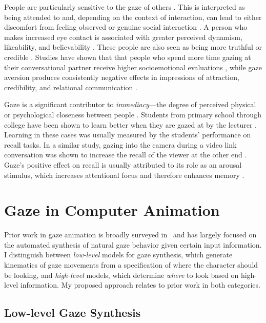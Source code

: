 People are particularly sensitive to the gaze of others \citep{argyle1976gaze}. This is interpreted as being attended to and, depending on the context of interaction, can lead to either discomfort from feeling observed or genuine social interaction \citep{argyle1976gaze}. A person who makes increased eye contact is associated with greater perceived dynamism, likeability, and believability \citep{beebe1976effects}. These people are also seen as being more truthful or credible \citep{argyle1976gaze}. Studies have shown that that people who spend more time gazing at their conversational partner receive higher socioemotional evaluations \citep{goldberg1969visual}, while gaze aversion produces consistently negative effects in impressions of attraction, credibility, and relational communication \citep{burgoon1986communicative}.

Gaze is a significant contributor to \emph{immediacy}---the degree of perceived physical or psychological closeness between people \citep{mehrabian1966immediacy}. Students from primary school through college have been shown to learn better when they are gazed at by the lecturer \citep{burgoon1986communicative, fry1975effects, sherwood1987facilitative, otteson1980effect}. Learning in these cases was usually measured by the students' performance on recall tasks. In a similar study, gazing into the camera during a video link conversation was shown to increase the recall of the viewer at the other end \citep{fullwood2006effect}. Gaze's positive effect on recall is usually attributed to its role as an arousal stimulus, which increases attentional focus and therefore enhances memory \cite{kelley1988effects}.

\section{Gaze in Computer Animation}
\label{sec:BackgroundGazeAnimation}

Prior work in gaze animation is broadly surveyed in~\citep{ruhland2015gazereview} and has largely focused on the automated synthesis of natural gaze behavior given certain input information. I distinguish between \emph{low-level} models for gaze synthesis, which generate kinematics of gaze movements from a specification of where the character should be looking, and \emph{high-level} models, which determine \emph{where} to look based on high-level information. My proposed approach relates to prior work in both categories.

\subsection{Low-level Gaze Synthesis}

